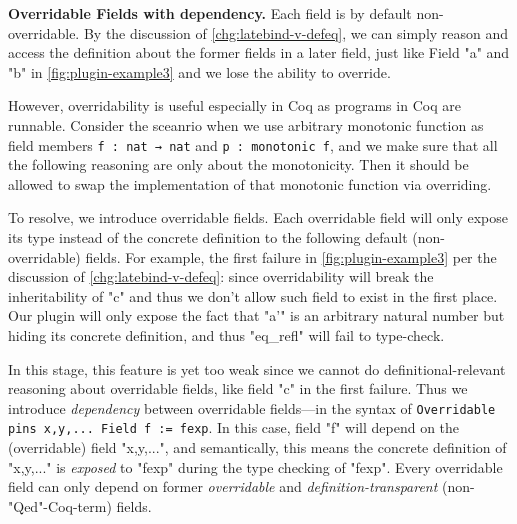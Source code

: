 

\textbf{Overridable Fields with dependency.}  Each field is by default non-overridable. By the discussion of \ref{chg:latebind-v-defeq}, we can simply reason and access the definition about the former fields in a later field, just like Field "a" and "b" in \cref{fig:plugin-example3} and we lose the ability to override. 

However, overridability is useful especially in Coq as programs in Coq are runnable. Consider the sceanrio when we use arbitrary monotonic function as field members \texttt{f : nat → nat} and \texttt{p : monotonic f}, and we make sure that all the following reasoning are only about the monotonicity. Then it should be allowed to swap the implementation of that monotonic function via overriding. 

To resolve, we introduce overridable fields. Each overridable field will only expose its type instead of the concrete definition to the following default (non-overridable) fields. For example, the first failure in \cref{fig:plugin-example3} per the discussion of \ref{chg:latebind-v-defeq}: since overridability will break the inheritability of "c" and thus we don't allow such field to exist in the first place. Our plugin will only expose the fact that "a'" is an arbitrary natural number but hiding its concrete definition, and thus "eq_refl" will fail to type-check.

In this stage, this feature is yet too weak since we cannot do definitional-relevant reasoning about overridable fields, like field "c" in the first failure. Thus we introduce \textit{dependency} between overridable fields---in the syntax of \texttt{Overridable pins {x,y,...} Field f := fexp}. In this case, field "f" will depend on the (overridable) field "x,y,...", and semantically, this means the concrete definition of "x,y,..." is \textit{exposed} to "fexp" during the type checking of "fexp". Every overridable field can only depend on former \textit{overridable} and \textit{definition-transparent} (non-"Qed"-Coq-term) fields. 

